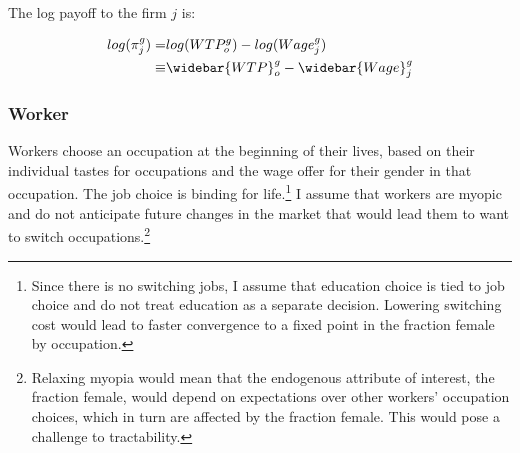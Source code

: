 \documentclass[12pt]{article}
\begin{document}
The log payoff to the firm $j$ is:




\begin{align} \label{logfirm}
  log(\pi^g_j)=&  log(WTP^g_o) -  log(Wage^g_j) \\ \nonumber
  \equiv & \widebar{WTP}^g_o - \widebar{Wage}^g_j
\end{align}







\subsubsection{Worker}

Workers choose an occupation at the beginning of their lives, based on their individual tastes for occupations and the wage offer for their gender in that occupation. The job choice is binding for life.\footnote{Since there is no switching jobs, I assume that education choice is tied to job choice and do not treat education as a separate decision. Lowering switching cost would lead to faster convergence to a fixed point in the fraction female by occupation.} I assume that workers are myopic and do not anticipate future changes in the market that would lead them to want to switch occupations.\footnote{Relaxing myopia would mean that the endogenous attribute of interest, the fraction female, would depend on expectations over other workers' occupation choices, which in turn are affected by the fraction female. This would pose a challenge to tractability.}
\end{document}
